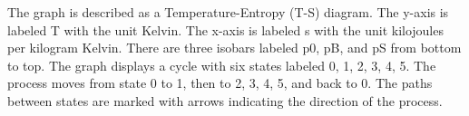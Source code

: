 The graph is described as a Temperature-Entropy (T-S) diagram. The y-axis is labeled T with the unit Kelvin. The x-axis is labeled s with the unit kilojoules per kilogram Kelvin. There are three isobars labeled p0, pB, and pS from bottom to top. The graph displays a cycle with six states labeled 0, 1, 2, 3, 4, 5. The process moves from state 0 to 1, then to 2, 3, 4, 5, and back to 0. The paths between states are marked with arrows indicating the direction of the process.